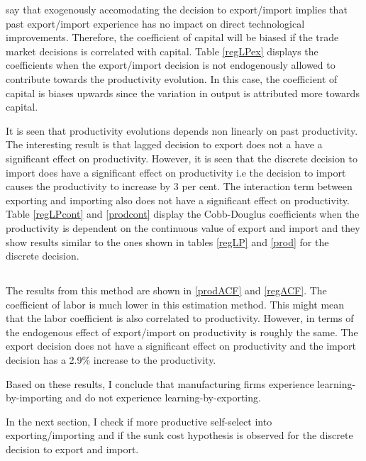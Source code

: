 \documentclass[11pt]{article}
\begin{document}
\cite{de2013detecting} say that exogenously accomodating the
decision to export/import implies that
past export/import experience has no impact on direct technological
improvements. Therefore, the coefficient of capital will be biased if
the trade market decisions is correlated with capital. Table
\ref{regLPex} displays the coefficients when the export/import
decision is not endogenously allowed to contribute towards the
productivity evolution. In this case, the coefficient of capital is
biases upwards since the variation in output is attributed more
towards capital.   


It is seen that productivity evolutions depends non linearly on past
productivity. The interesting result is that lagged decision to export does not a have
a significant effect on productivity. However, it is seen that the
discrete decision to import does have a significant effect on productivity i.e the
decision to import causes the productivity to increase by 3 per
cent. The interaction term between exporting and importing also does
not have a significant effect on productivity. 
Table \ref{regLPcont} and \ref{prodcont} display the Cobb-Douglus coefficients when the
productivity is dependent on the continuous value of export and import
and they show results similar to the ones shown in tables \ref{regLP}
and \ref{prod} for the discrete decision. 

\subsection{\cite{ackerberg2006structural}}
The results from this method are shown in \ref{prodACF} and
\ref{regACF}. The coefficient of labor is much lower in this
estimation method. This might mean that the labor coefficient is also
correlated to productivity. However, in terms of the endogenous effect
of export/import on productivity is roughly the same. The export
decision does not have a significant effect on productivity and the
import decision has a 2.9\% increase to the productivity. 



Based on these results, I conclude that manufacturing firms experience learning-by-importing and
do not experience learning-by-exporting.



In the next section, I check if more productive self-select into
exporting/importing and if the sunk cost hypothesis is observed for
the discrete decision to export and import. 
\end{document}
